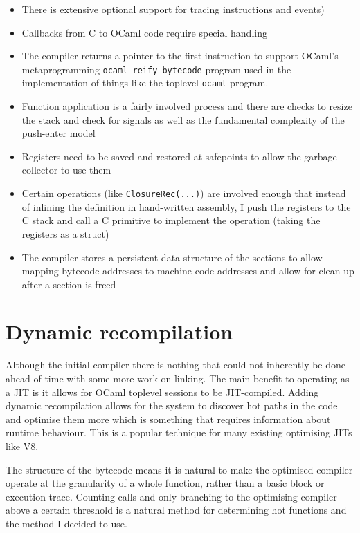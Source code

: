 \begin{itemize}
      \item There is extensive optional support for tracing instructions and events)
      \item Callbacks from C to OCaml code require special handling
      \item The compiler returns a pointer to the first instruction to support OCaml's
            metaprogramming \texttt{ocaml\_reify\_bytecode} program used in the implementation of
            things like the
            toplevel \texttt{ocaml} program.
      \item Function application is a fairly involved process and there are checks to resize the
            stack and check for signals as well as the fundamental complexity of the push-enter
            model
      \item Registers need to be saved and restored at safepoints to allow the garbage collector to
            use them
      \item Certain operations (like \texttt{ClosureRec(...)}) are involved enough that instead of
            inlining the definition in
            hand-written assembly, I push the registers to the C stack and call a C primitive to
            implement the
            operation (taking the registers as a struct)
      \item The compiler stores a persistent data structure of the sections to allow mapping
            bytecode addresses to machine-code addresses and allow for clean-up after a section is
            freed
\end{itemize}

\section{Dynamic recompilation} \label{dyn-recomp}

Although the initial compiler there is nothing that could not inherently be done ahead-of-time with
some more work on linking. The main benefit to operating as a JIT is it allows for OCaml toplevel
sessions to be JIT-compiled. Adding dynamic recompilation allows for the system to discover hot
paths in the code and optimise them more which is something that requires information about runtime
behaviour. This is a popular technique for many existing optimising JITs like V8.

The structure of the bytecode means it is natural to make the optimised compiler operate at the
granularity of a whole function, rather than a basic block or execution trace. Counting calls and
only branching to the optimising compiler above a certain threshold is a natural method for
determining hot functions and the method I decided to use.

